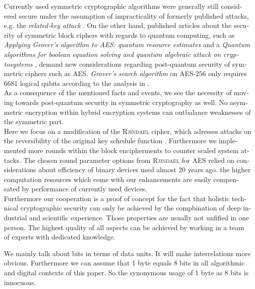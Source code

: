 \documentclass[a4paper,11pt]{article}
\begin{document}
\begin{otherlanguage}{english}
\begin{multicols}{2}

\noindent
Currently used symmetric cryptographic algorithms were generally still considered secure under the assumption of impracticality of formerly published attacks, e.g. the  \textit{related-key attack} \cite{HFE}. On the other hand,  published articles about the security of symmetric block ciphers with regards to quantum computing, such as \textit{Applying Grover’s algorithm to AES: quantum resource estimates} \cite{GRO} and a \textit{Quantum algorithms for boolean equation solving and quantum algebraic attack on cryptosystems} \cite{QAA}, demand new considerations regarding post-quantum security of symmetric ciphers such as \textsc{AES}. \textit{Grover's search algorithm} on \textsc{AES}-$256$ only requires $6681$ logical qubits according to the analysis in \cite{GRO}.\\

\noindent
As a consequence of the mentioned facts and events, we see the necessity of moving towards post-quantum security in symmetric cryptography as well. No asymmetric encryption within hybrid encryption systems can outbalance weaknesses of the symmetric part.\\

\noindent
Here we focus on a modification of the \textsc{Rjindael} cipher, which adresses attacks on the reversibility of the original key schedule function \cite{CRK, HFE}. Furthermore we implemented more rounds within the block encipherments to counter scaled system attacks. The chosen round parameter options from \textsc{Rjindael} for \textsc{AES} relied on considerations about efficiency of binary devices used almost $20$ years ago. the higher computation resources which come with our enhancements are easily compensated by performance of currently used devices.\\

\noindent
Furthermore our cooperation is a proof of concept for the fact that holistic technical cryptographic security can only be achieved by the compbination of deep industrial and scientific experience. Those properties are usually not unfified in one person. The highest quality of all aspects can be achieved by working in a team of experts with dedicated knowledge.\\


\noindent
We mainly talk about bits in terms of data units. It will make interrelations more obvious. Furthermore we can assume that 1 byte equals 8 bits in all algorithmic and digital contexts of this paper. So the synonymous usage of 1 byte as 8 bits is innocuous.  \\


\end{multicols}
\end{otherlanguage}
\end{document}
